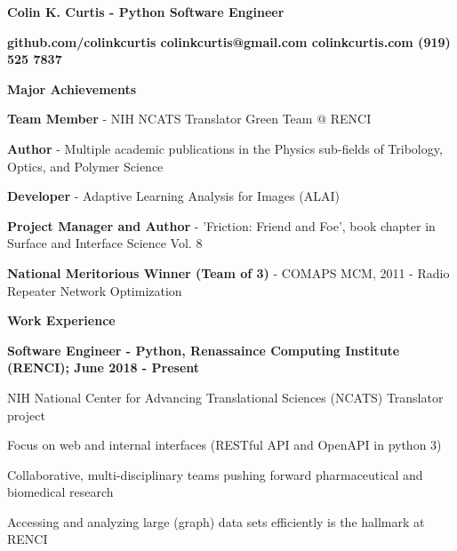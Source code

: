 \documentclass[letterpaper,final]{memoir}
\newcommand{\LargeSep}{\vspace{1.3em}}
\newcommand{\Sep}{\vspace{1.0em}}
\newcommand{\SmallSep}{\vspace{0.4em}}
\newcommand{\CVSection}[1]
	{\LARGE\textbf{#1}\par
	\SmallSep\normalsize}
\newcommand{\CVItem}[1]
	{\textbf{\color{Blue} #1}}
\newcommand\tab[1][1cm]{\hspace*{#1}}
\begin{document}
\Huge \bfseries {\color{Blue} Colin K. Curtis - Python Software Engineer}

\SmallSep
\normalsize\normalfont

\CVItem  \tab \bfseries {github.com/colinkcurtis \tab colinkcurtis@gmail.com  \tab colinkcurtis.com \tab  (919) 525 7837} 

\Sep





\notoserif \CVSection{Major Achievements}
\normalfont

\Sep

\begin{compactitem}
    
    \item \textbf{Team Member} - NIH NCATS Translator Green Team @ RENCI
    \SmallSep

    \item \textbf{Author} - Multiple academic publications in the Physics sub-fields of Tribology, Optics, and Polymer Science
    \SmallSep

    \item \textbf{Developer} - Adaptive Learning Analysis for Images (ALAI) 
    \SmallSep

    \item \textbf{Project Manager and Author} - 'Friction: Friend and Foe', book chapter in Surface and Interface Science Vol. 8
    \SmallSep
    
    \item \textbf{National Meritorious Winner (Team of 3)} - COMAPS MCM, 2011 - Radio Repeater Network Optimization
	
\end{compactitem}

\LargeSep


\notoserif \CVSection{Work Experience}
\normalfont

\Sep

\CVItem{Software Engineer - Python, Renassaince Computing Institute (RENCI); June 2018 - Present}
\begin{compactitem}[\color{Blue}$\circ$]
    
    \SmallSep

    \item NIH National Center for Advancing Translational Sciences (NCATS) Translator project
    \item Focus on web and internal interfaces (RESTful API and OpenAPI in python 3)
    \item Collaborative, multi-disciplinary teams pushing forward pharmaceutical and biomedical research
    \item Accessing and analyzing large (graph) data sets efficiently is the hallmark at RENCI

\end{compactitem}
\end{document}
